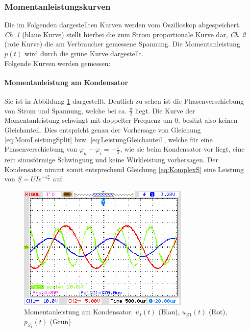 \subsubsection{Momentanleistungskurven}

Die im Folgenden dargestellten Kurven werden vom Oszilloskop abgespeichert. \textit{Ch~1} (blaue Kurve) stellt hierbei die zum Strom proportionale Kurve dar, \textit{Ch~2} (rote Kurve) die am Verbraucher gemessene Spannung. Die Momentanleistung $p(t)$ wird durch die grüne Kurve dargestellt.
\\
Folgende Kurven werden gemessen:

\paragraph{Momentanleistung am Kondensator}
Sie ist in Abbildung \ref{fig:MomLKurveZ1} dargestellt. Deutlich zu sehen ist die Phasenverschiebung von Strom und Spannung, welche bei ca. $\frac{\pi}{2}$ liegt. Die Kurve der Momentanleistung schwingt mit doppelter Frequenz um 0, besitzt also keinen Gleichanteil. Dies entspricht genau der Vorhersage von Gleichung \eqref{eq:MomLeistungSplit} bzw. \eqref{eq:LeistungGleichanteil}, welche für eine Phasenverschiebung von $\varphi_u - \varphi_i = -\frac{\pi}{2}$, wie sie beim Kondensator vor liegt, eine rein sinusförmige Schwingung und keine Wirkleistung vorhersagen. Der Kondensator nimmt somit entsprechend Gleichung \eqref{eq:KomplexS} eine Leistung von $\underline{S} = UIe^{-i\frac{\pi}{2}}$ auf.\par

\begin{figure}[H]
\centering
\includegraphics[width=0.7\linewidth]{Oszi-Bitmaps/NewFile0.jpg}
\caption{Momentanleistung am Kondensator. $u_I(t)$ (Blau), $u_{Z1}(t)$ (Rot), $p_{Z_1}(t)$ (Grün)}
\label{fig:MomLKurveZ1}
\end{figure}

